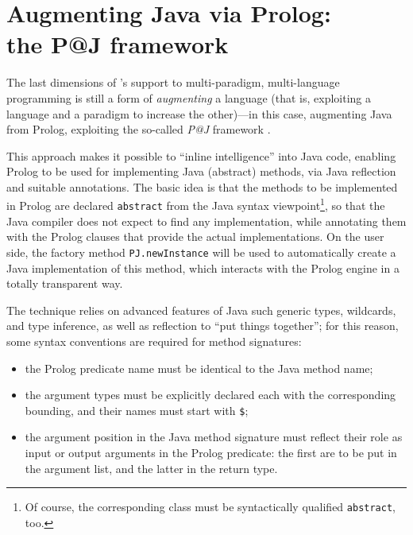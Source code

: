 \section{Augmenting Java via Prolog:\\the P@J framework}
\label{sec:p@j}

The last dimensions of \tuprolog{}'s support to multi-paradigm, multi-language programming is still a form of \textit{augmenting} a language (that is, exploiting a language and a paradigm to increase the other)---in this case, augmenting Java from Prolog, exploiting the so-called \textit{P@J} framework \cite{short-patj-sac08}.

This approach makes it possible to ``inline intelligence'' into Java code, enabling Prolog to be used for implementing Java (abstract) methods, via Java reflection and suitable annotations.
%
The basic idea is that the methods to be implemented in Prolog are declared
\texttt{abstract} from the Java syntax viewpoint\footnote{%
  Of course, the corresponding class must be syntactically qualified \texttt{abstract}, too.
}, so that the Java compiler does not expect to find any implementation, while annotating them with the Prolog clauses that provide the actual implementations.
On the user side, the factory method \texttt{PJ.newInstance} will be used to automatically create a Java implementation of this method, which interacts with the Prolog engine in a totally transparent way.

The technique relies on advanced features of Java such generic types, wildcards, and type inference, as well as reflection to ``put things together''; for this reason, some syntax conventions are required for method signatures:
\begin{itemize}
  \item the Prolog predicate name must be identical to the Java method name;

  \item the argument types must be explicitly declared each with the corresponding bounding, and their names must start with \texttt{\$};

  \item the argument position in the Java method signature must reflect their role as input or output arguments in the Prolog predicate: the first are to be put in the argument list, and the latter in the return type.
\end{itemize}

